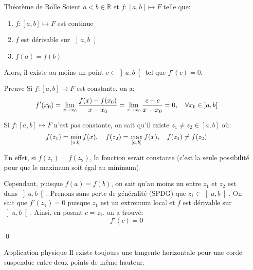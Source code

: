 \documentclass[a4paper]{article}
\begin{document}
\begin{parag}{Théorème de Rolle}
    Soient $a < b \in \mathbb{R}$ et $f : \left[a, b\right] \mapsto F$ telle que:
    \begin{enumerate}
        \item $f : \left[a, b\right] \mapsto F$ est continue
        \item $f$ est dérivable sur $\left]a, b\right[ $
        \item $f\left(a\right) = f\left(b\right)$
    \end{enumerate}
    
    Alors, il existe au moins un point $c \in \left]a, b\right[$ tel que $f'\left(c\right) = 0$.

    \begin{subparag}{Preuve}
        Si $f : \left[a, b\right] \mapsto F$ est constante, on a: 
        \[f'\left(x_0\right) = \lim_{x \to x_0} \frac{f\left(x\right) - f\left(x_0\right)}{x - x_0} = \lim_{x \to x_0} \frac{c - c}{x - x_0} = 0, \mathspace \forall x_0 \in \left]a, b\right[ \]
        
        \vspace{1em}

        Si $f : \left[a, b\right] \mapsto F$ n'est pas constante, on sait qu'il existe $z_1 \neq z_2 \in \left[a, b\right]$ où: 
        \[f\left(z_1\right) = \min_{\left[a, b\right]}f\left(x\right), \mathspace f\left(z_2\right) = \max_{\left[a,b\right]}f\left(x\right), \mathspace f\left(z_1\right) \neq f\left(z_2\right)\]
        
        En effet, si $f\left(z_1\right) = f\left(z_2\right)$, la fonction serait constante (c'est la seule possibilité pour que le maximum soit égal au minimum).

        Cependant, puisque $f\left(a\right) = f\left(b\right)$, on sait qu'au moins un entre $z_1$ et $z_2$ est dans $\left]a, b\right[ $. Prenons sans perte de généralité (SPDG) que $z_1 \in \left]a,b\right[ $. On sait que $f'\left(z_1\right) = 0$ puisque $z_1$ est un extremum local et $f$ est dérivable sur $\left]a,b\right[ $. Ainsi, en posant $c = z_1$, on a trouvé: 
        \[f'\left(c\right) = 0\]
        
        \qed
    \end{subparag}
    

    \begin{subparag}{Application physique}
        Il existe toujours une tangente horizontale pour une corde suspendue entre deux points de même hauteur.

    \end{subparag}
    
\end{parag}
\end{document}
